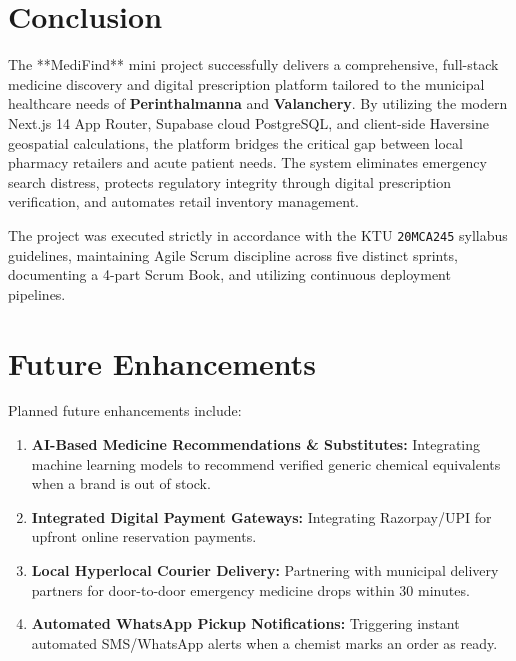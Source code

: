 \documentclass[12pt,a4paper]{report}
\begin{document}
\section{Conclusion}
The **MediFind** mini project successfully delivers a comprehensive, full-stack medicine discovery and digital prescription platform tailored to the municipal healthcare needs of \textbf{Perinthalmanna} and \textbf{Valanchery}. By utilizing the modern Next.js 14 App Router, Supabase cloud PostgreSQL, and client-side Haversine geospatial calculations, the platform bridges the critical gap between local pharmacy retailers and acute patient needs. The system eliminates emergency search distress, protects regulatory integrity through digital prescription verification, and automates retail inventory management.

The project was executed strictly in accordance with the KTU \texttt{20MCA245} syllabus guidelines, maintaining Agile Scrum discipline across five distinct sprints, documenting a 4-part Scrum Book, and utilizing continuous deployment pipelines.

\section{Future Enhancements}
Planned future enhancements include:
\begin{enumerate}
    \item \textbf{AI-Based Medicine Recommendations & Substitutes:} Integrating machine learning models to recommend verified generic chemical equivalents when a brand is out of stock.
    \item \textbf{Integrated Digital Payment Gateways:} Integrating Razorpay/UPI for upfront online reservation payments.
    \item \textbf{Local Hyperlocal Courier Delivery:} Partnering with municipal delivery partners for door-to-door emergency medicine drops within 30 minutes.
    \item \textbf{Automated WhatsApp Pickup Notifications:} Triggering instant automated SMS/WhatsApp alerts when a chemist marks an order as ready.
\end{enumerate}

\newpage



\newpage
\end{document}
